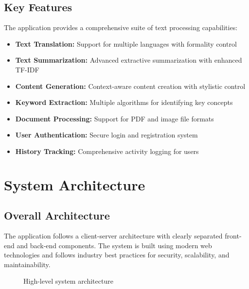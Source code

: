 \documentclass[12pt,a4paper]{article}
\begin{document}
\subsection{Key Features}

The application provides a comprehensive suite of text processing capabilities:

\begin{itemize}
    \item \textbf{Text Translation:} Support for multiple languages with formality control
    \item \textbf{Text Summarization:} Advanced extractive summarization with enhanced TF-IDF
    \item \textbf{Content Generation:} Context-aware content creation with stylistic control
    \item \textbf{Keyword Extraction:} Multiple algorithms for identifying key concepts
    \item \textbf{Document Processing:} Support for PDF and image file formats
    \item \textbf{User Authentication:} Secure login and registration system
    \item \textbf{History Tracking:} Comprehensive activity logging for users
\end{itemize}

\section{System Architecture}

\subsection{Overall Architecture}

The application follows a client-server architecture with clearly separated front-end and back-end components. The system is built using modern web technologies and follows industry best practices for security, scalability, and maintainability.

\begin{figure}[H]
\centering
{}
\caption{High-level system architecture}
\end{figure}
\end{document}
